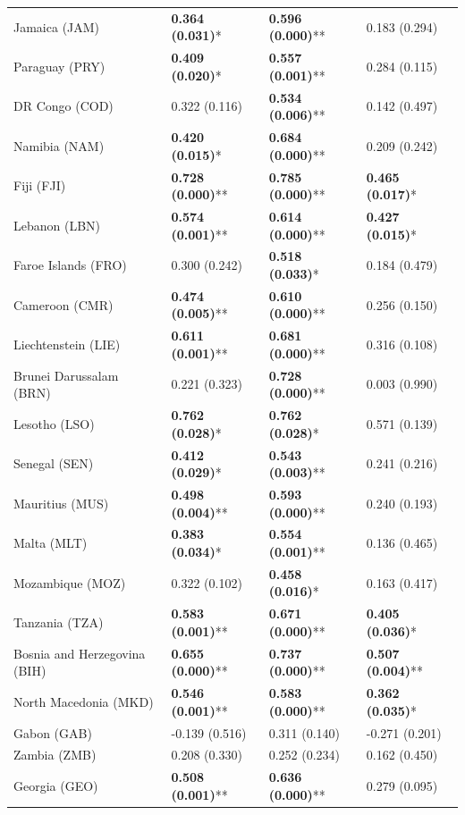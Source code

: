 \begin{longtable}{p{4cm}p{3cm}p{3cm}p{3cm}}
Jamaica (JAM) & \textbf{0.364 (0.031)}* & \textbf{0.596 (0.000)}** & 0.183 (0.294) \\
Paraguay (PRY) & \textbf{0.409 (0.020)}* & \textbf{0.557 (0.001)}** & 0.284 (0.115) \\
DR Congo (COD) & 0.322 (0.116) & \textbf{0.534 (0.006)}** & 0.142 (0.497) \\
Namibia (NAM) & \textbf{0.420 (0.015)}* & \textbf{0.684 (0.000)}** & 0.209 (0.242) \\
Fiji (FJI) & \textbf{0.728 (0.000)}** & \textbf{0.785 (0.000)}** & \textbf{0.465 (0.017)}* \\
Lebanon (LBN) & \textbf{0.574 (0.001)}** & \textbf{0.614 (0.000)}** & \textbf{0.427 (0.015)}* \\
Faroe Islands (FRO) & 0.300 (0.242) & \textbf{0.518 (0.033)}* & 0.184 (0.479) \\
Cameroon (CMR) & \textbf{0.474 (0.005)}** & \textbf{0.610 (0.000)}** & 0.256 (0.150) \\
Liechtenstein (LIE) & \textbf{0.611 (0.001)}** & \textbf{0.681 (0.000)}** & 0.316 (0.108) \\
Brunei Darussalam (BRN) & 0.221 (0.323) & \textbf{0.728 (0.000)}** & 0.003 (0.990) \\
Lesotho (LSO) & \textbf{0.762 (0.028)}* & \textbf{0.762 (0.028)}* & 0.571 (0.139) \\
Senegal (SEN) & \textbf{0.412 (0.029)}* & \textbf{0.543 (0.003)}** & 0.241 (0.216) \\
Mauritius (MUS) & \textbf{0.498 (0.004)}** & \textbf{0.593 (0.000)}** & 0.240 (0.193) \\
Malta (MLT) & \textbf{0.383 (0.034)}* & \textbf{0.554 (0.001)}** & 0.136 (0.465) \\
Mozambique (MOZ) & 0.322 (0.102) & \textbf{0.458 (0.016)}* & 0.163 (0.417) \\
Tanzania (TZA) & \textbf{0.583 (0.001)}** & \textbf{0.671 (0.000)}** & \textbf{0.405 (0.036)}* \\
Bosnia and Herzegovina (BIH) & \textbf{0.655 (0.000)}** & \textbf{0.737 (0.000)}** & \textbf{0.507 (0.004)}** \\
North Macedonia (MKD) & \textbf{0.546 (0.001)}** & \textbf{0.583 (0.000)}** & \textbf{0.362 (0.035)}* \\
Gabon (GAB) & -0.139 (0.516) & 0.311 (0.140) & -0.271 (0.201) \\
Zambia (ZMB) & 0.208 (0.330) & 0.252 (0.234) & 0.162 (0.450) \\
Georgia (GEO) & \textbf{0.508 (0.001)}** & \textbf{0.636 (0.000)}** & 0.279 (0.095) \\

\end{longtable}
